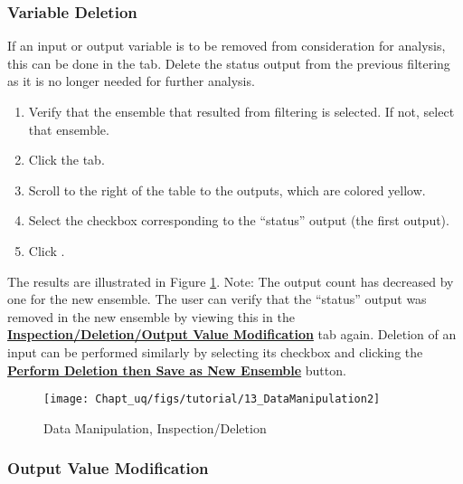 \subsubsection{Variable Deletion}
\label{subsubsec:uqt_vardel}

If an input or output variable is to be removed from consideration for
analysis, this can be done in the  tab. Delete the status output from the previous filtering
as it is no longer needed for further analysis.
\begin{enumerate}
\item{Verify that the ensemble that resulted from filtering is selected. If not, select that ensemble.}
\item{Click the  tab.}
\item{Scroll to the right of the table to the outputs, which are colored yellow.}
\item{Select the checkbox corresponding to the ``status'' output (the first output).}
\item{Click .}
\end{enumerate}
The results are illustrated in Figure \ref{fig:uqt_data_mod}. Note: The output count has decreased by one for the new ensemble. The user can verify that the ``status'' output was removed in the new ensemble by viewing this in the \textbf{\underline{Inspection/Deletion/Output Value Modification}} tab again. Deletion of an input can be performed similarly by selecting its checkbox and clicking the \textbf{\underline{Perform Deletion then Save as New Ensemble}} button.

\begin{figure}[H]
\centering \texttt{[image: Chapt\_uq/figs/tutorial/13\_DataManipulation2]}
\caption{Data Manipulation, Inspection/Deletion}
\label{fig:uqt_data_mod}
\end{figure}

\subsubsection{Output Value Modification}

